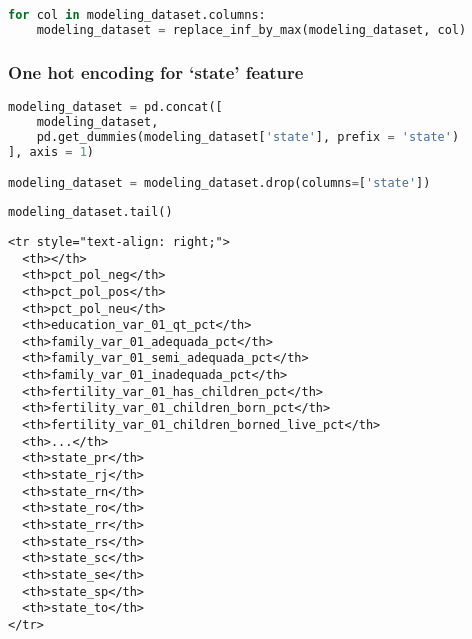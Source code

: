 \begin{lstlisting}[language=Python]
for col in modeling_dataset.columns:
    modeling_dataset = replace_inf_by_max(modeling_dataset, col)
\end{lstlisting}

\subsubsection{\texorpdfstring{One hot encoding for `state'
feature}{One hot encoding for state feature}}\label{one-hot-encoding-for-state-feature}

\begin{lstlisting}[language=Python]
modeling_dataset = pd.concat([
    modeling_dataset,
    pd.get_dummies(modeling_dataset['state'], prefix = 'state')
], axis = 1)

modeling_dataset = modeling_dataset.drop(columns=['state'])
\end{lstlisting}

\begin{lstlisting}[language=Python]
modeling_dataset.tail()
\end{lstlisting}

\begin{lstlisting}
<tr style="text-align: right;">
  <th></th>
  <th>pct_pol_neg</th>
  <th>pct_pol_pos</th>
  <th>pct_pol_neu</th>
  <th>education_var_01_qt_pct</th>
  <th>family_var_01_adequada_pct</th>
  <th>family_var_01_semi_adequada_pct</th>
  <th>family_var_01_inadequada_pct</th>
  <th>fertility_var_01_has_children_pct</th>
  <th>fertility_var_01_children_born_pct</th>
  <th>fertility_var_01_children_borned_live_pct</th>
  <th>...</th>
  <th>state_pr</th>
  <th>state_rj</th>
  <th>state_rn</th>
  <th>state_ro</th>
  <th>state_rr</th>
  <th>state_rs</th>
  <th>state_sc</th>
  <th>state_se</th>
  <th>state_sp</th>
  <th>state_to</th>
</tr>
\end{lstlisting}

